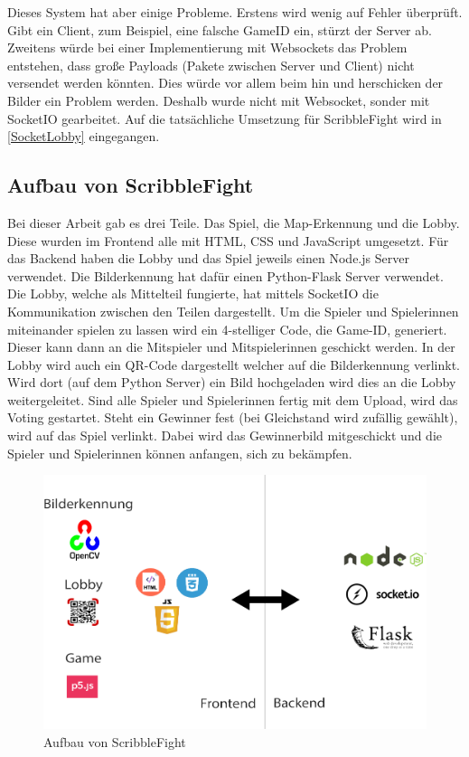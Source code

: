 Dieses System hat aber einige Probleme. Erstens wird wenig auf Fehler überprüft.
Gibt ein Client, zum Beispiel, eine falsche GameID ein, stürzt der Server ab. Zweitens würde bei einer Implementierung mit
Websockets das Problem entstehen, dass große Payloads (Pakete zwischen Server und Client) nicht versendet werden könnten.
Dies würde vor allem beim hin und herschicken der Bilder ein Problem werden. Deshalb wurde
nicht mit Websocket, sonder mit SocketIO gearbeitet. Auf die tatsächliche Umsetzung für ScribbleFight wird in
\ref{SocketLobby} eingegangen.

\subsection{Aufbau von ScribbleFight}
Bei dieser Arbeit gab es drei Teile. Das Spiel, die Map-Erkennung und die Lobby. Diese wurden im Frontend alle mit HTML, CSS und JavaScript umgesetzt.
Für das Backend haben die Lobby und das Spiel jeweils einen Node.js Server verwendet. Die Bilderkennung hat dafür einen Python-Flask Server verwendet. Die Lobby, welche als Mittelteil fungierte, hat mittels SocketIO die Kommunikation zwischen den Teilen dargestellt.
Um die Spieler und Spielerinnen miteinander spielen zu lassen wird ein 4-stelliger Code, die Game-ID, generiert. Dieser kann dann an die Mitspieler und Mitspielerinnen geschickt werden. In der Lobby wird auch ein QR-Code dargestellt welcher auf die Bilderkennung verlinkt.
Wird dort (auf dem Python Server) ein Bild hochgeladen wird dies an die Lobby weitergeleitet. Sind alle Spieler und Spielerinnen fertig mit dem Upload, wird das Voting gestartet. Steht ein Gewinner fest (bei Gleichstand wird zufällig gewählt), wird auf das Spiel verlinkt. Dabei wird das Gewinnerbild mitgeschickt und die Spieler und Spielerinnen können anfangen, sich zu bekämpfen.
\begin{figure}[H]
    \centering
    \includegraphics[scale=0.3]{pics/architektur.png}
    \caption{Aufbau von ScribbleFight}
\end{figure}

